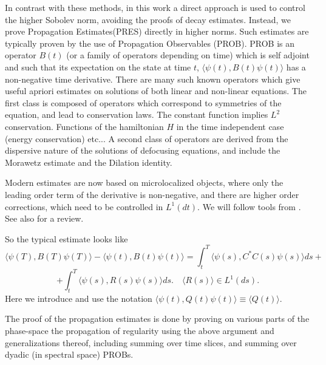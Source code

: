 \documentclass[11pt]{article}
\begin{document}
In contrast with these methods, in this work a direct approach is used to control the higher Sobolev norm, avoiding the proofs of decay estimates.
Instead, we prove Propagation Estimates(PRES) directly in higher norms. Such estimates are typically proven by the use of Propagation Observables (PROB).
PROB is an operator $B(t)$ (or a family of operators depending on time) which is self adjoint and such that its expectation on the state at time $t$, $\langle \psi(t), B(t)\psi(t)\rangle$ has a non-negative time derivative.
There are many such known operators which give useful  apriori estimates on solutions of both linear and non-linear equations.
The first class is composed of operators which correspond to symmetries of the equation, and lead to conservation laws. The constant function implies $L^2$ conservation. Functions of the hamiltonian $H$ in the time independent case (energy conservation) etc...
A second class of operators are derived from the dispersive nature of the solutions of defocusing equations, and include the Morawetz estimate and the Dilation identity.

Modern estimates are now based on microlocalized objects, where only the leading order term of the derivative is non-negative, and there are higher order corrections, which need to be controlled in $L^1(dt).$ We will follow tools from \cite{sigal1986asymptotic, graf1990asymptotic,derezinski2013scattering,HSS,sigal1987n,sigal1988local,liu2025large,soffer2022large,soffer2011monotonic}. See also \cite{soffer2024new} for a  review.

So the typical estimate looks like 
\[ \langle \psi(T), B(T)\psi(T)\rangle -\langle \psi(t), B(t)\psi(t)\rangle=\int_t^T \langle \psi(s), C^*C(s)\psi(s)\rangle ds+
\]
\[
+\int_t^T \langle \psi(s), R(s)\psi(s)\rangle ds. \quad \langle R(s)\rangle \in L^1(ds).
\]
Here we introduce and use the notation $\langle\psi(t), Q(t)\psi(t)\rangle\equiv  \langle Q(t)\rangle. $

The proof of the propagation estimates is done by proving on various parts of the phase-space the propagation of regularity using the above argument and generalizations thereof, including summing over time slices, and summing over dyadic (in spectral space) PROBs.
\end{document}
